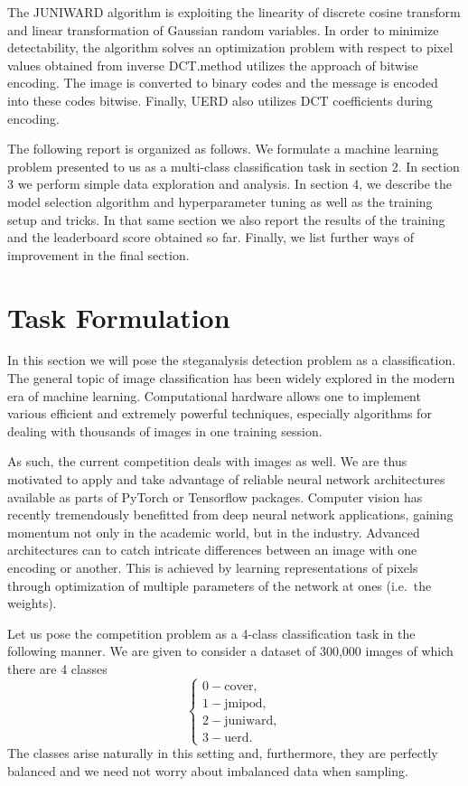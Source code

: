 \documentclass[letterpaper]{article}
\begin{document}
The JUNIWARD algorithm is exploiting the linearity of discrete cosine transform and linear transformation of Gaussian random variables. In order to minimize detectability, the algorithm solves an optimization problem with respect to pixel values obtained from inverse DCT.\@JMiPOD method utilizes the approach of bitwise encoding. The image is converted to binary codes and the message is encoded into these codes bitwise. Finally, UERD also utilizes DCT coefficients during encoding.

The following report is organized as follows. We formulate a machine learning problem presented to us as a multi-class classification task in section 2. In section 3 we perform simple data exploration and analysis. In section 4, we describe the model selection algorithm and hyperparameter tuning as well as the training setup and tricks. In that same section we also report the results of the training and the leaderboard score obtained so far. Finally, we list further ways of improvement in the final section.

\section{Task Formulation}

In this section we will pose the steganalysis detection problem as a classification. The general topic of image classification has been widely explored in the modern era of machine learning. Computational hardware allows one to implement various efficient and extremely powerful techniques, especially algorithms for dealing with thousands of images in one training session.

As such, the current competition deals with images as well. We are thus motivated to apply  and take advantage of reliable neural network architectures available as parts of PyTorch or Tensorflow packages. Computer vision has recently tremendously benefitted from deep neural network applications, gaining momentum not only in the academic world, but in the industry. Advanced architectures can to catch intricate differences between an image with one encoding or another. This is achieved by learning representations of pixels through optimization of multiple parameters of the network at ones (i.e.\ the weights).

Let us pose the competition problem as a 4-class classification task in the following manner. We are given to consider a dataset of 300,000 images of which there are 4 classes
\[ \begin{cases}
        0 -\text{cover},     \\
        1 - \text{jmipod},   \\
        2 - \text{juniward}, \\
        3 - \text{uerd}.
    \end{cases} \]
The classes arise naturally in this setting and, furthermore, they are perfectly balanced and we need not worry about imbalanced data when sampling.
\end{document}

